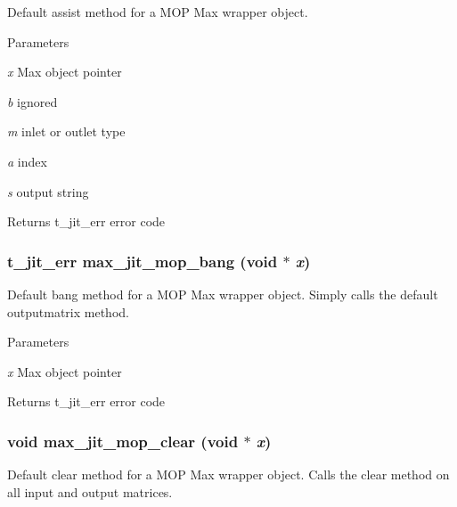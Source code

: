 Default assist method for a MOP Max wrapper object. 
\begin{DoxyParams}{Parameters}
\item[{\em x}]Max object pointer \item[{\em b}]ignored \item[{\em m}]inlet or outlet type \item[{\em a}]index \item[{\em s}]output string\end{DoxyParams}
\begin{DoxyReturn}{Returns}
t\_\-jit\_\-err error code 
\end{DoxyReturn}
\hypertarget{group__maxmopmod_ga2d8a375d2971f54b85315fb9f0d2bfc5}{
\subsubsection[{max\_\-jit\_\-mop\_\-bang}]{\setlength{\rightskip}{0pt plus 5cm}t\_\-jit\_\-err max\_\-jit\_\-mop\_\-bang (void $\ast$ {\em x})}}
\label{group__maxmopmod_ga2d8a375d2971f54b85315fb9f0d2bfc5}


Default bang method for a MOP Max wrapper object. Simply calls the default outputmatrix method.


\begin{DoxyParams}{Parameters}
\item[{\em x}]Max object pointer\end{DoxyParams}
\begin{DoxyReturn}{Returns}
t\_\-jit\_\-err error code 
\end{DoxyReturn}
\hypertarget{group__maxmopmod_gab397419fccc40f7a17c6bff07458aee0}{
\subsubsection[{max\_\-jit\_\-mop\_\-clear}]{\setlength{\rightskip}{0pt plus 5cm}void max\_\-jit\_\-mop\_\-clear (void $\ast$ {\em x})}}
\label{group__maxmopmod_gab397419fccc40f7a17c6bff07458aee0}


Default clear method for a MOP Max wrapper object. Calls the clear method on all input and output matrices.


